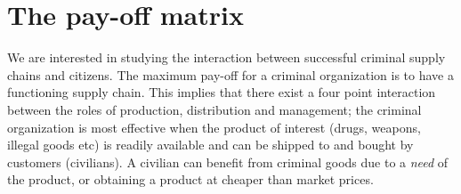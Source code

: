 \documentclass[a4paper, 11pt, twocolumn]{article}
\begin{document}
\section{The pay-off matrix}
\label{sec:orgf7f8751}
We  are  interested  in  studying  the  interaction  between
successful criminal supply chains  and citizens. The maximum
pay-off for a criminal organization is to have a functioning
supply chain.  This implies that  there exist a  four point
interaction  between the  roles of  production, distribution
and management; the criminal  organization is most effective
when the product of  interest (drugs, weapons, illegal goods
etc) is readily  available and can be shipped  to and bought
by  customers  (civilians).  A  civilian  can  benefit  from
criminal goods due to a  \emph{need} of the product, or obtaining
a product at cheaper than market prices.
\end{document}
